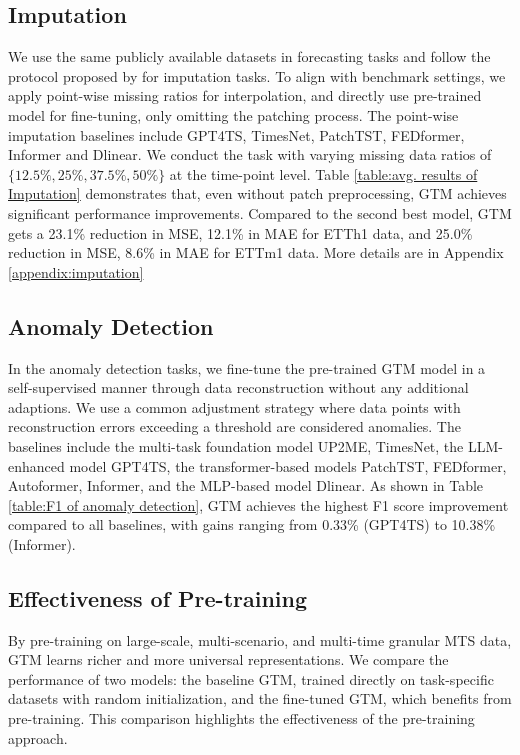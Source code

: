 

\subsection{Imputation}
\label{exp:imputation}
We use the same publicly available datasets in forecasting tasks and follow the protocol proposed by \cite{Zhou23} for imputation tasks. To align with benchmark settings, we apply point-wise missing ratios for interpolation, and directly use pre-trained model for fine-tuning, only omitting the patching process. The point-wise imputation baselines include GPT4TS, TimesNet, PatchTST, FEDformer, Informer and Dlinear.
We conduct the task with varying missing data ratios of $\{12.5\%, 25\%, 37.5\%, 50\%\}$ at the time-point level. Table \ref{table:avg. results of Imputation} demonstrates that, even without patch preprocessing, GTM achieves significant performance improvements. Compared to the second best model, GTM gets a 23.1\% reduction in MSE, 12.1\% in MAE for ETTh1 data, and 25.0\% reduction in MSE, 8.6\% in MAE for ETTm1 data. More details are in Appendix \ref{appendix:imputation}










 
\subsection{Anomaly Detection}



In the anomaly detection tasks, we fine-tune the pre-trained GTM model in a self-supervised manner through data reconstruction without any additional adaptions. We use a common adjustment strategy\cite{Xu18} where data points with reconstruction errors exceeding a threshold are considered anomalies. The baselines include the multi-task foundation model UP2ME, TimesNet, the LLM-enhanced model GPT4TS,  the transformer-based models PatchTST, FEDformer, Autoformer, Informer, and the MLP-based model Dlinear. As shown in Table \ref{table:F1 of anomaly detection}, GTM achieves the highest F1 score improvement compared to all baselines, with gains ranging from 0.33\% (GPT4TS) to 10.38\% (Informer).








\subsection{Effectiveness of Pre-training}
By pre-training on large-scale, multi-scenario, and multi-time granular MTS data, GTM learns richer and more universal representations. We compare the performance of two models: the baseline GTM, trained directly on task-specific datasets with random initialization, and the fine-tuned GTM, which benefits from pre-training. This comparison highlights the effectiveness of the pre-training approach.

